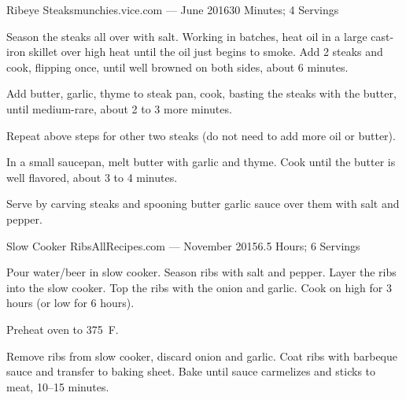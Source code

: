 \documentclass{article}
\begin{document}
\begin{recipe}{Ribeye Steaks}{munchies.vice.com --- June 2016}{30 Minutes; 4 Servings}

   Season the steaks all over with salt. Working in batches, heat oil in a large
   cast-iron skillet over high heat until the oil just begins to smoke. Add 2
   steaks and cook, flipping once, until well browned on both sides, about 6
   minutes.

   Add butter, garlic, thyme to steak pan, cook, basting the steaks with the
   butter, until medium-rare, about 2 to 3 more minutes.

   Repeat above steps for other two steaks (do not need to add more oil or
   butter).

   In a small saucepan, melt butter with garlic and thyme. Cook until the butter
   is well flavored, about 3 to 4 minutes.

   \newstep
   Serve by carving steaks and spooning butter garlic sauce over them with salt
   and pepper.

\end{recipe}

\begin{recipe}{Slow Cooker Ribs}{AllRecipes.com --- November 2015}{6.5 Hours; 6 Servings}

   Pour water/beer in slow cooker.  Season ribs with salt and pepper.  Layer the
   ribs into the slow cooker.  Top the ribs with the onion and garlic.  Cook on
   high for 3 hours (or low for 6 hours).

   \newstep
   Preheat oven to 375\ \0F.

   Remove ribs from slow cooker, discard onion and garlic.  Coat ribs with
   barbeque sauce and transfer to baking sheet.  Bake until sauce carmelizes and
   sticks to meat, 10--15 minutes.

\end{recipe}
\end{document}
